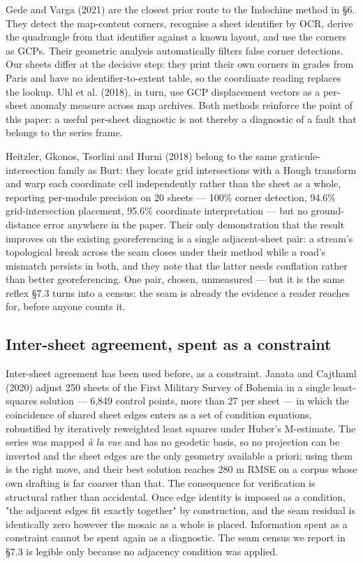 \documentclass[11pt,a4paper]{article}
\begin{document}
Gede and Varga (2021) are the closest prior route to the Indochine method in §6. They detect the map-content corners, recognise a sheet identifier by OCR, derive the quadrangle from that identifier against a known layout, and use the corners as GCPs. Their geometric analysis automatically filters false corner detections. Our sheets differ at the decisive step: they print their own corners in grades from Paris and have no identifier-to-extent table, so the coordinate reading replaces the lookup. Uhl et al. (2018), in turn, use GCP displacement vectors as a per-sheet anomaly measure across map archives. Both methods reinforce the point of this paper: a useful per-sheet diagnostic is not thereby a diagnostic of a fault that belongs to the series frame.

Heitzler, Gkonos, Tsorlini and Hurni (2018) belong to the same graticule-intersection family as Burt: they locate grid intersections with a Hough transform and warp each coordinate cell independently rather than the sheet as a whole, reporting per-module precision on 20 sheets — 100\% corner detection, 94.6\% grid-intersection placement, 95.6\% coordinate interpretation — but no ground-distance error anywhere in the paper. Their only demonstration that the result improves on the existing georeferencing is a single adjacent-sheet pair: a stream's topological break across the seam closes under their method while a road's mismatch persists in both, and they note that the latter needs conflation rather than better georeferencing. One pair, chosen, unmeasured — but it is the same reflex §7.3 turns into a census: the seam is already the evidence a reader reaches for, before anyone counts it.

\subsection{Inter-sheet agreement, spent as a constraint}

Inter-sheet agreement has been used before, as a constraint. Janata and Cajthaml (2020) adjust 250 sheets of the First Military Survey of Bohemia in a single least-squares solution — 6,849 control points, more than 27 per sheet — in which the coincidence of shared sheet edges enters as a set of condition equations, robustified by iteratively reweighted least squares under Huber's M-estimate. The series was mapped \emph{à la vue} and has no geodetic basis, so no projection can be inverted and the sheet edges are the only geometry available a priori; using them is the right move, and their best solution reaches 280 m RMSE on a corpus whose own drafting is far coarser than that. The consequence for verification is structural rather than accidental. Once edge identity is imposed as a condition, "the adjacent edges fit exactly together" by construction, and the seam residual is identically zero however the mosaic as a whole is placed. Information spent as a constraint cannot be spent again as a diagnostic. The seam census we report in §7.3 is legible only because no adjacency condition was applied.
\end{document}
